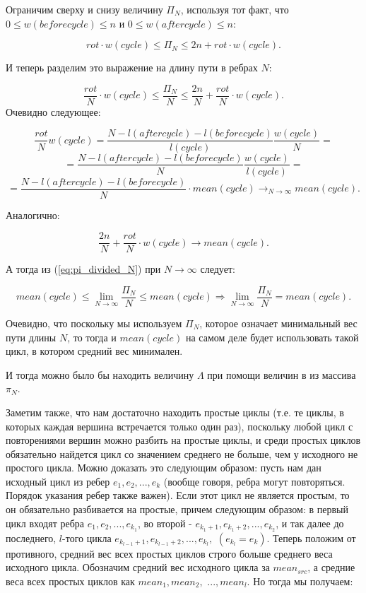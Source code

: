 \documentclass[a4paper,12pt]{report}
\theoremstyle{plain} %
\theoremstyle{definition}
\theoremstyle{remark}
\begin{document}
\begin{large}
Ограничим сверху и снизу величину $\Pi_N$, используя тот факт, что $0 \le w(beforecycle) \le n$ и $0 \le w(aftercycle) \le n$:

$$rot \cdot w(cycle) \le \Pi_N \le 2n + rot \cdot w(cycle).$$

И теперь разделим это выражение на длину пути в ребрах $N$:

\begin{equation}\label{eq:pi_divided_N}
\frac{rot}{N} \cdot w(cycle) \le \frac{\Pi_N}{N} \le \frac{2n}{N} + \frac{rot}{N} \cdot w(cycle).\end{equation}
Очевидно следующее:

$$\frac{rot}{N} w(cycle) = \frac{N - l(aftercycle) - l(beforecycle)}{l(cycle)}\frac{w(cycle)}{N}=$$
$$=\frac{N - l(aftercycle) - l(beforecycle)}{N}\frac{w(cycle)}{l(cycle)} =$$
$$= \frac{N - l(aftercycle) - l(beforecycle)}{N} \cdot mean(cycle) \rightarrow_{N \rightarrow \infty} mean(cycle).$$

Аналогично:

$$\frac{2n}{N} + \frac{rot}{N} \cdot w(cycle) \rightarrow mean(cycle).$$

А тогда из (\ref{eq:pi_divided_N}) при $N \rightarrow \infty$ следует:

$$mean(cycle) \le \lim_{N \rightarrow \infty} \frac{\Pi_N}{N} \le mean(cycle) \Rightarrow \lim_{N \rightarrow \infty}\frac{\Pi_N}{N} = mean(cycle).$$

Очевидно, что поскольку мы используем $\Pi_N$, которое означает минимальный вес пути длины $N$, то тогда и $mean(cycle)$ на самом деле будет использовать такой цикл, в котором средний вес минимален.

И тогда можно было бы находить величину $\Lambda$ при помощи величин в из массива $\pi_N$.

Заметим также, что нам достаточно находить простые циклы (т.е. те циклы, в которых каждая вершина встречается только один раз), поскольку любой цикл с повторениями вершин можно разбить на простые циклы, и среди простых циклов обязательно найдется цикл со значением среднего не больше, чем у исходного не простого цикла. Можно доказать это следующим образом: пусть нам дан исходный цикл из ребер $e_1, e_2, ..., e_k$ (вообще говоря, ребра могут повторяться. Порядок указания ребер также важен). Если этот цикл не является простым, то он обязательно разбивается на простые, причем следующим образом: в первый цикл входят ребра $e_1, e_2, ..., e_{k_1}$, во второй - $e_{k_1+1}, e_{k_1+2}, ..., e_{k_2}$, и так далее до последнего, $l$-того цикла $e_{k_{l-1}+1}, e_{k_{l-1}+2}, ..., e_{k_l},$ $(e_{k_l} = e_k)$.  Теперь положим от противного, средний вес всех простых циклов строго больше среднего веса исходного цикла. Обозначим средний вес исходного цикла за $mean_{src}$, а средние веса всех простых циклов как $mean_1, mean_2,$ $..., mean_l$. Но тогда мы получаем:


\end{large}
\end{document}
